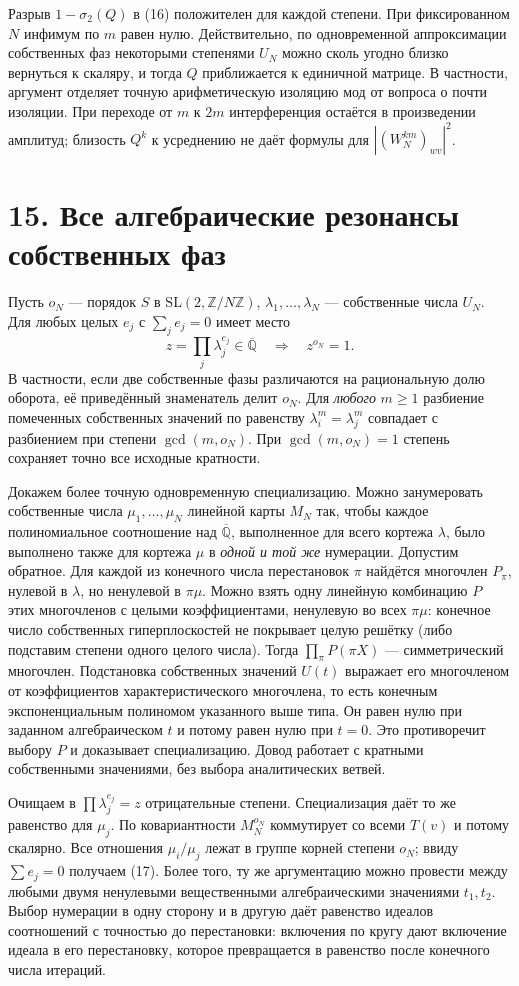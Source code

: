 \documentclass[11pt,a4paper]{article}
\newcommand{\Z}{\mathbb Z}
\newcommand{\sect}[1]{\section*{\sffamily\color{ink}#1}}
\begin{document}
Разрыв $1-\sigma_2(Q)$ в (16) положителен для каждой степени. При фиксированном $N$ инфимум по $m$ равен нулю. Действительно, по одновременной аппроксимации собственных фаз некоторыми степенями $U_N$ можно сколь угодно близко вернуться к скаляру, и тогда $Q$ приближается к единичной матрице. В частности, аргумент отделяет точную арифметическую изоляцию мод от вопроса о почти изоляции. При переходе от $m$ к $2m$ интерференция остаётся в произведении амплитуд; близость $Q^k$ к усреднению не даёт формулы для $| (W_N^{km})_{wv}|^2$.
\newpage
\sect{15. Все алгебраические резонансы собственных фаз}
Пусть $o_N$ --- порядок $S$ в $\mathrm{SL}(2,\Z/N\Z)$, $\lambda_1,\ldots,\lambda_N$ --- собственные числа $U_N$. Для любых целых $e_j$ с $\sum_j e_j=0$ имеет место
\[
 z=\prod_j\lambda_j^{e_j}\in\overline{\mathbb Q}
                 \quad\Longrightarrow\quad z^{o_N}=1 .                  \tag{17}
\]
В частности, если две собственные фазы различаются на рациональную долю оборота, её приведённый знаменатель делит $o_N$. Для \emph{любого} $m\ge1$ разбиение помеченных собственных значений по равенству $\lambda_i^m=\lambda_j^m$ совпадает с разбиением при степени $\gcd(m,o_N)$. При $\gcd(m,o_N)=1$ степень сохраняет точно все исходные кратности.

Докажем более точную одновременную специализацию. Можно занумеровать собственные числа $\mu_1,\ldots,\mu_N$ линейной карты $M_N$ так, чтобы каждое полиномиальное соотношение над $\overline{\mathbb Q}$, выполненное для всего кортежа $\lambda$, было выполнено также для кортежа $\mu$ в \emph{одной и той же} нумерации. Допустим обратное. Для каждой из конечного числа перестановок $\pi$ найдётся многочлен $P_\pi$, нулевой в $\lambda$, но ненулевой в $\pi\mu$. Можно взять одну линейную комбинацию $P$ этих многочленов с целыми коэффициентами, ненулевую во всех $\pi\mu$: конечное число собственных гиперплоскостей не покрывает целую решётку (либо подставим степени одного целого числа). Тогда $\prod_\pi P(\pi X)$ --- симметрический многочлен. Подстановка собственных значений $U(t)$ выражает его многочленом от коэффициентов характеристического многочлена, то есть конечным экспоненциальным полиномом указанного выше типа. Он равен нулю при заданном алгебраическом $t$ и потому равен нулю при $t=0$. Это противоречит выбору $P$ и доказывает специализацию. Довод работает с кратными собственными значениями, без выбора аналитических ветвей.

Очищаем в $\prod\lambda_j^{e_j}=z$ отрицательные степени. Специализация даёт то же равенство для $\mu_j$. По ковариантности $M_N^{o_N}$ коммутирует со всеми $T(v)$ и потому скалярно. Все отношения $\mu_i/\mu_j$ лежат в группе корней степени $o_N$; ввиду $\sum e_j=0$ получаем (17). Более того, ту же аргументацию можно провести между любыми двумя ненулевыми вещественными алгебраическими значениями $t_1,t_2$. Выбор нумерации в одну сторону и в другую даёт равенство идеалов соотношений с точностью до перестановки: включения по кругу дают включение идеала в его перестановку, которое превращается в равенство после конечного числа итераций.
\end{document}
